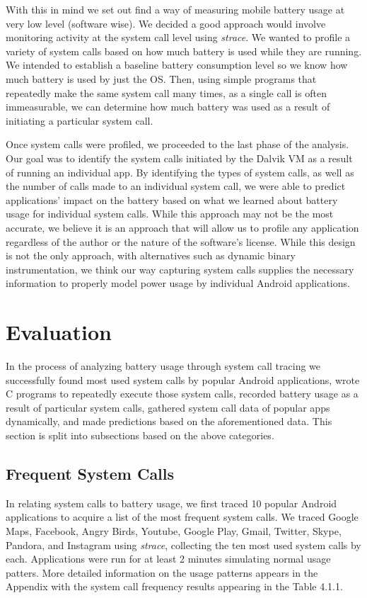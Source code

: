 \documentclass[11pt]{article}
\begin{document}
With this in mind we set out find a way of measuring mobile battery usage at very low level
(software wise). We decided a good approach would involve monitoring activity at the system 
call level using \textit{strace}. We wanted to profile a variety of system calls 
based on how much battery is used while they are running. We intended to establish a baseline 
battery consumption level so we know how much battery is used by just the OS. Then, using 
simple programs that repeatedly make the same system call many times, as a single call is often
immeasurable, we can determine how much battery was used as a result of initiating a particular system call.  

Once system calls were profiled, we proceeded to the last phase of the analysis. Our 
goal was to identify the system calls initiated by the Dalvik VM as a result of running an 
individual app. By identifying the types of system calls, as well as the number of calls made 
to an individual system call, we were able to predict applications' impact on the battery based 
on what we learned about battery usage for individual system calls. While this approach may not 
be the most accurate, we believe it is an approach that will allow us to profile any 
application regardless of the author or the nature of the software's license.  While this design is 
not the only approach, with alternatives such as dynamic binary instrumentation, we think our way 
capturing system calls supplies the necessary information to properly model power usage by individual
Android applications.


\section{Evaluation}

In the process of analyzing battery usage through system call tracing we successfully
found most used system calls by popular Android applications, wrote C programs to 
repeatedly execute those system calls, recorded battery usage as a result of particular 
system calls, gathered system call data of popular apps dynamically, and made predictions 
based on the aforementioned data.  This section is split into subsections based on the above
categories.

\subsection{Frequent System Calls}

In relating system calls to battery usage, we first traced 10 popular Android
applications to acquire a list of the most frequent system calls.  We traced Google Maps, 
Facebook, Angry Birds, Youtube, Google Play, Gmail, Twitter, Skype, Pandora, and Instagram 
using \textit{strace}, collecting the ten most used system calls by each.  Applications were 
run for at least 2 minutes simulating normal usage patters.  More detailed information on the usage 
patterns appears in the Appendix with the system call frequency results appearing in the Table 4.1.1.
\end{document}
